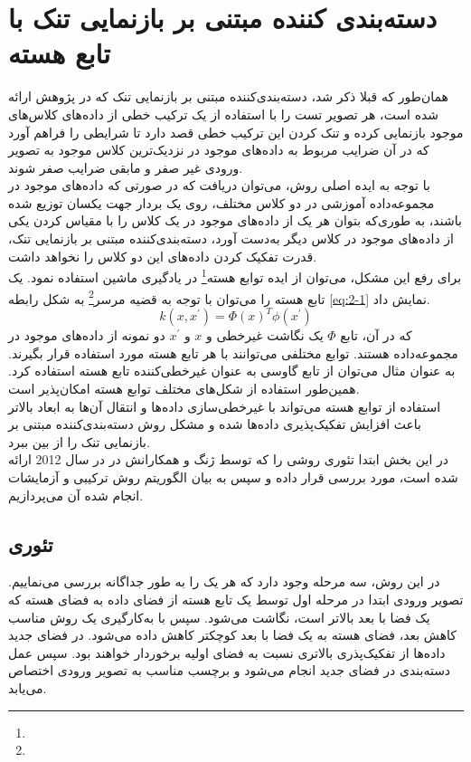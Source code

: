 \documentclass[12pt,twocolumn]{article}
\newcommand{\enfootnote}[1]{\footnote{\lr{#1}}}
\begin{document}
\section{دسته‌بندی کننده مبتنی بر بازنمایی تنک با تابع هسته}
همان‌طور که قبلا ذکر شد، دسته‌بندی‌کننده مبتنی بر بازنمایی تنک که در پژوهش \cite{wright2009robust} ارائه شده است، هر تصویر تست را با استفاده از یک ترکیب خطی از داده‌های کلاس‌های موجود بازنمایی کرده و تنک‌ کردن این ترکیب خطی قصد دارد تا شرایطی را فراهم آورد که در آن ضرایب مربوط به داده‌های موجود در نزدیک‌ترین کلاس موجود به تصویر ورودی غیر صفر و مابقی ضرایب صفر شوند.
\\
با توجه به ایده اصلی روش، می‌توان دریافت که در صورتی که داده‌های موجود در مجموعه‌داده آموزشی در دو کلاس مختلف، روی یک بردار جهت یکسان توزیع شده باشند، به طوری‌که بتوان هر یک از داده‌های موجود در یک کلاس را با مقیاس کردن یکی از داده‌های موجود در کلاس دیگر به‌دست آورد، دسته‌بندی‌کننده مبتنی بر بازنمایی تنک،‌ قدرت تفکیک‌ کردن داده‌های این دو کلاس را نخواهد داشت.
\\
برای رفع این مشکل، می‌توان از ایده توابع هسته\enfootnote{Kernel Functions} در یادگیری ماشین استفاده نمود. یک تابع هسته را می‌توان با توجه به قضیه مرسر\enfootnote{Mercer's Theorem} به شکل رابطه \eqref{eq:2-1} نمایش داد.
\begin{equation}
k(x, x^\prime) = \Phi(x)^T\phi(x^\prime)
\label{fig:2-1}
\end{equation}
که در آن، تابع $\Phi$ یک نگاشت غیرخطی و $x$ و $x^\prime$ دو نمونه از داده‌های موجود در مجموعه‌داده هستند. توابع مختلفی ‌می‌توانند با هر تابع هسته مورد استفاده قرار بگیرند. به عنوان مثال‌ می‌توان از تابع گاوسی به عنوان غیرخطی‌کننده تابع هسته استفاده کرد. همین‌طور استفاده از شکل‌های مختلف توابع هسته امکان‌پذیر است.
\\
استفاده از توابع هسته می‌تواند با غیرخطی‌سازی داده‌ها و انتقال آن‌ها به ابعاد بالاتر باعث افزایش تفکیک‌پذیری داده‌ها شده و مشکل روش دسته‌بندی‌کننده مبتنی بر بازنمایی تنک را از بین ببرد.
\\
در این بخش ابتدا تئوری روشی را که توسط ژنگ و همکارانش در \cite{zhang2012kernel} در سال 2012 ارائه شده است، مورد بررسی قرار داده و سپس به بیان الگوریتم روش ترکیبی و آزمایشات انجام شده آن می‌پردازیم.

\subsection{تئوری}
در این روش، سه مرحله وجود دارد که هر یک را به طور جداگانه بررسی می‌نماییم. تصویر ورودی ابتدا در مرحله اول توسط یک تابع هسته از فضای داده به فضای هسته که یک فضا با بعد بالاتر است، نگاشت می‌شود. سپس با به‌کارگیری یک روش مناسب کاهش بعد، فضای هسته به یک فضا با بعد کوچکتر کاهش داده‌ می‌شود. در فضای جدید داده‌ها از تفکیک‌پذری بالاتری نسبت به فضای اولیه برخوردار خواهند بود. سپس عمل دسته‌بندی در فضای جدید انجام می‌شود و برچسب مناسب به تصویر ورودی اختصاص می‌یابد.
\end{document}
